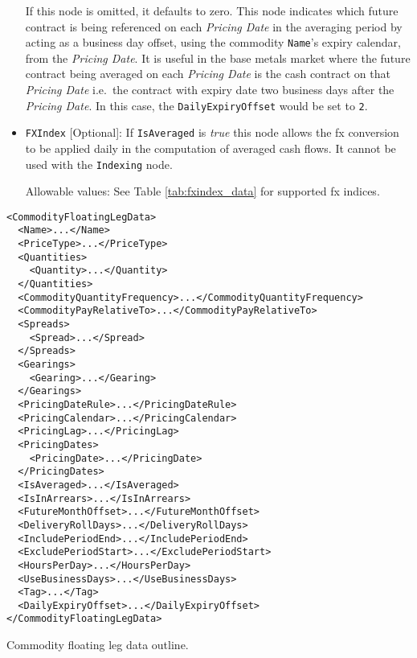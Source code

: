 \begin{itemize}
If this node is omitted, it defaults to zero. This node indicates which future contract is being referenced on each \textit{Pricing Date} in the averaging period by acting as a business day offset, using the commodity \lstinline!Name!'s expiry calendar, from the \textit{Pricing Date}. It is useful in the base metals market where the future contract being averaged on each \textit{Pricing Date} is the cash contract on that \textit{Pricing Date} i.e.\ the contract with expiry date two business days after the \textit{Pricing Date}. In this case, the \lstinline!DailyExpiryOffset! would be set to \lstinline!2!.

\item \lstinline!FXIndex! [Optional]: If \lstinline!IsAveraged! is \emph{true} this node allows the fx conversion to be applied daily in the computation of averaged cash flows. It cannot be used with the \lstinline!Indexing! node.

Allowable values:  See Table \ref{tab:fxindex_data} for supported fx indices.
\end{itemize}

\begin{listing}[h!]
\begin{verbatim}
<CommodityFloatingLegData>
  <Name>...</Name>
  <PriceType>...</PriceType>
  <Quantities>
    <Quantity>...</Quantity>
  </Quantities>
  <CommodityQuantityFrequency>...</CommodityQuantityFrequency>
  <CommodityPayRelativeTo>...</CommodityPayRelativeTo>
  <Spreads>
    <Spread>...</Spread>
  </Spreads>
  <Gearings>
    <Gearing>...</Gearing>
  </Gearings>
  <PricingDateRule>...</PricingDateRule>
  <PricingCalendar>...</PricingCalendar>
  <PricingLag>...</PricingLag>
  <PricingDates>
    <PricingDate>...</PricingDate>
  </PricingDates>
  <IsAveraged>...</IsAveraged>
  <IsInArrears>...</IsInArrears>
  <FutureMonthOffset>...</FutureMonthOffset>
  <DeliveryRollDays>...</DeliveryRollDays>
  <IncludePeriodEnd>...</IncludePeriodEnd>
  <ExcludePeriodStart>...</ExcludePeriodStart>
  <HoursPerDay>...</HoursPerDay>
  <UseBusinessDays>...</UseBusinessDays>
  <Tag>...</Tag>
  <DailyExpiryOffset>...</DailyExpiryOffset>
</CommodityFloatingLegData>
\end{verbatim}
\caption{Commodity floating leg data outline.}
\label{lst:commodity_floating_leg_data}
\end{listing}

